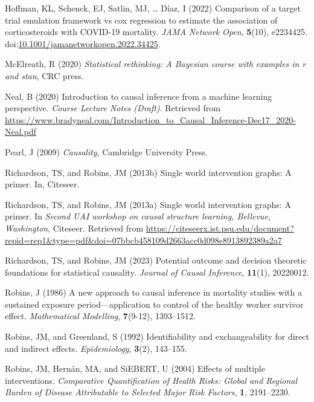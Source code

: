 \documentclass[
  single column]{article}
\newlength{\cslhangindent}
\newenvironment{CSLReferences}[2] %
 {\begin{list}{}{%
  \setlength{\itemindent}{0pt}
  \setlength{\leftmargin}{0pt}
  \setlength{\parsep}{0pt}
  \ifodd #1
   \setlength{\leftmargin}{\cslhangindent}
   \setlength{\itemindent}{-1\cslhangindent}
  \fi
  \setlength{\itemsep}{#2\baselineskip}}}
 {\end{list}}
\begin{document}
\begin{CSLReferences}{1}{0}
Hoffman, KL, Schenck, EJ, Satlin, MJ, \ldots{} Díaz, I (2022) Comparison
of a target trial emulation framework vs cox regression to estimate the
association of corticosteroids with COVID-19 mortality. \emph{JAMA
Network Open}, \textbf{5}(10), e2234425.
doi:\href{https://doi.org/10.1001/jamanetworkopen.2022.34425}{10.1001/jamanetworkopen.2022.34425}.

McElreath, R (2020) \emph{Statistical rethinking: A {B}ayesian course
with examples in r and stan}, CRC press.

Neal, B (2020) Introduction to causal inference from a machine learning
perspective. \emph{Course Lecture Notes (Draft)}. Retrieved from
\url{https://www.bradyneal.com/Introduction_to_Causal_Inference-Dec17_2020-Neal.pdf}

Pearl, J (2009) \emph{Causality}, Cambridge University Press.

Richardson, TS, and Robins, JM (2013b) Single world intervention graphs:
A primer. In, Citeseer.

Richardson, TS, and Robins, JM (2013a) Single world intervention graphs:
A primer. In \emph{Second UAI workshop on causal structure learning,
{B}ellevue, {W}ashington}, Citeseer. Retrieved from
\url{https://citeseerx.ist.psu.edu/document?repid=rep1&type=pdf&doi=07bbcb458109d2663acc0d098e8913892389a2a7}

Richardson, TS, and Robins, JM (2023) Potential outcome and decision
theoretic foundations for statistical causality. \emph{Journal of Causal
Inference}, \textbf{11}(1), 20220012.

Robins, J (1986) A new approach to causal inference in mortality studies
with a sustained exposure period---application to control of the healthy
worker survivor effect. \emph{Mathematical Modelling}, \textbf{7}(9-12),
1393--1512.

Robins, JM, and Greenland, S (1992) Identifiability and exchangeability
for direct and indirect effects. \emph{Epidemiology}, \textbf{3}(2),
143--155.

Robins, JM, Hernán, MA, and SiEBERT, U (2004) Effects of multiple
interventions. \emph{Comparative Quantification of Health Risks: Global
and Regional Burden of Disease Attributable to Selected Major Risk
Factors}, \textbf{1}, 2191--2230.


\end{CSLReferences}
\end{document}
